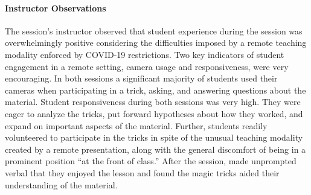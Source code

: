 \paragraph{Instructor Observations}
The session's instructor observed that student experience during
the session was overwhelmingly positive considering
the difficulties imposed by a remote teaching modality enforced by COVID-19
restrictions.
Two key indicators of student engagement in a remote setting, camera usage
and responsiveness, were very encouraging.
In both sessions a significant majority of students used their
cameras when participating in a trick, asking, and answering questions
about the material.
Student responsiveness during both sessions was very high.
They were eager to analyze the
tricks, put forward hypotheses about how they worked,
and expand on important aspects of the material.
Further, students readily volunteered to participate in the tricks in spite
of the unusual teaching modality created by a remote presentation,
along with the general discomfort of being in a
prominent position ``at the front of class.''
After the session,
made
unprompted verbal that they enjoyed the
lesson and found the magic tricks aided their understanding of the
material.
